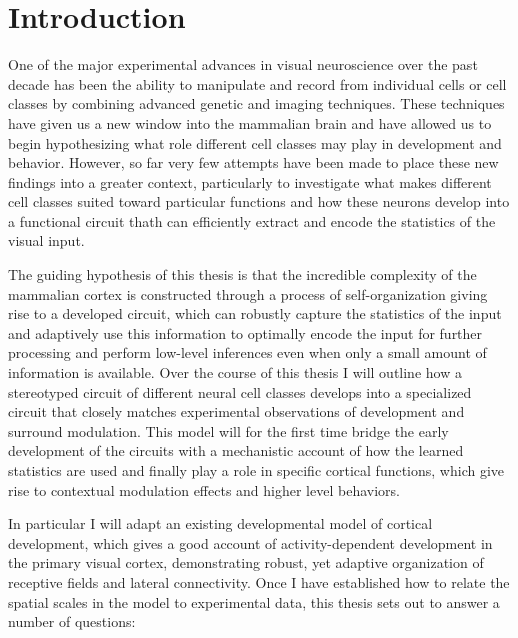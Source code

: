 \chapter{Introduction}

One of the major experimental advances in visual neuroscience over the
past decade has been the ability to manipulate and record from
individual cells or cell classes by combining advanced genetic and
imaging techniques. These techniques have given us a new window into
the mammalian brain and have allowed us to begin hypothesizing what
role different cell classes may play in development and
behavior. However, so far very few attempts have been made to place
these new findings into a greater context, particularly to investigate
what makes different cell classes suited toward particular functions
and how these neurons develop into a functional circuit thath can
efficiently extract and encode the statistics of the visual input.

The guiding hypothesis of this thesis is that the incredible
complexity of the mammalian cortex is constructed through a process of
self-organization giving rise to a developed circuit, which can
robustly capture the statistics of the input and adaptively use this
information to optimally encode the input for further processing and
perform low-level inferences even when only a small amount of
information is available. Over the course of this thesis I will
outline how a stereotyped circuit of different neural cell classes
develops into a specialized circuit that closely matches experimental
observations of development and surround modulation. This model will
for the first time bridge the early development of the circuits with a
mechanistic account of how the learned statistics are used and finally
play a role in specific cortical functions, which give rise to
contextual modulation effects and higher level behaviors.

In particular I will adapt an existing developmental model of cortical
development, which gives a good account of activity-dependent
development in the primary visual cortex, demonstrating robust, yet
adaptive organization of receptive fields and lateral connectivity.
Once I have established how to relate the spatial scales in the model
to experimental data, this thesis sets out to answer a number of
questions:

